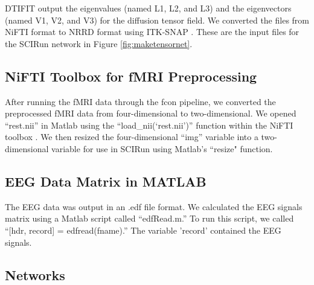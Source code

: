 DTIFIT output the eigenvalues (named L1, L2, and L3) and the eigenvectors (named V1, V2, and V3) for the diffusion tensor field. We converted the files from NiFTI format to NRRD format using ITK-SNAP \cite{ref:itksnap}. These are the input files for the SCIRun network in Figure \ref{fig:maketensornet}.

\subsection{NiFTI Toolbox for fMRI Preprocessing}
\label{sec:nifti}

After running the fMRI data through the fcon pipeline, we converted the preprocessed fMRI data from four-dimensional to two-dimensional. We opened ``rest.nii'' in Matlab using the ``load\_nii(`rest.nii')'' function within the NiFTI toolbox \cite{ref:nifti}. We then resized the four-dimensional ``img'' variable into a two-dimensional variable for use in SCIRun using Matlab's ``resize" function.

\subsection{EEG Data Matrix in MATLAB}
\label{ref:eegmatlab}

The EEG data was output in an .edf file format. We calculated the EEG signals matrix using a Matlab script called ``edfRead.m.'' \cite{ref:edfread} To run this script, we called ``[hdr, record] = edfread(fname).'' The variable 'record' contained the EEG signals. 

\subsection{Networks}
\label{sec:networks}

